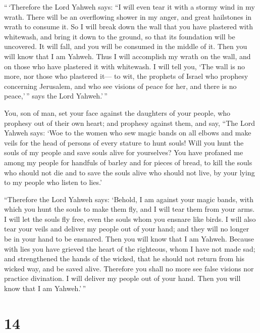  ``\,`Therefore the Lord Yahweh says: ``I will even tear
it with a stormy wind in my wrath. There will be an overflowing shower
in my anger, and great hailstones in wrath to consume it.
 So I will break down the wall that you have plastered
with whitewash, and bring it down to the ground, so that its foundation
will be uncovered. It will fall, and you will be consumed in the middle
of it. Then you will know that I am Yahweh.  Thus I will
accomplish my wrath on the wall, and on those who have plastered it with
whitewash. I will tell you, `The wall is no more, nor those who
plastered it---  to wit, the prophets of Israel who
prophesy concerning Jerusalem, and who see visions of peace for her, and
there is no peace,'\,'' says the Lord Yahweh.'\,''

 You, son of man, set your face against the daughters of
your people, who prophesy out of their own heart; and prophesy against
them,  and say, ``The Lord Yahweh says: `Woe to the women
who sew magic bands on all elbows and make veils for the head of persons
of every stature to hunt souls! Will you hunt the souls of my people and
save souls alive for yourselves?  You have profaned me
among my people for handfuls of barley and for pieces of bread, to kill
the souls who should not die and to save the souls alive who should not
live, by your lying to my people who listen to lies.'

 ``Therefore the Lord Yahweh says: `Behold, I am against
your magic bands, with which you hunt the souls to make them fly, and I
will tear them from your arms. I will let the souls fly free, even the
souls whom you ensnare like birds.  I will also tear your
veils and deliver my people out of your hand; and they will no longer be
in your hand to be ensnared. Then you will know that I am Yahweh.
 Because with lies you have grieved the heart of the
righteous, whom I have not made sad; and strengthened the hands of the
wicked, that he should not return from his wicked way, and be saved
alive.  Therefore you shall no more see false visions nor
practice divination. I will deliver my people out of your hand. Then you
will know that I am Yahweh.'\,''

\hypertarget{section-13}{%
\section{14}\label{section-13}}

